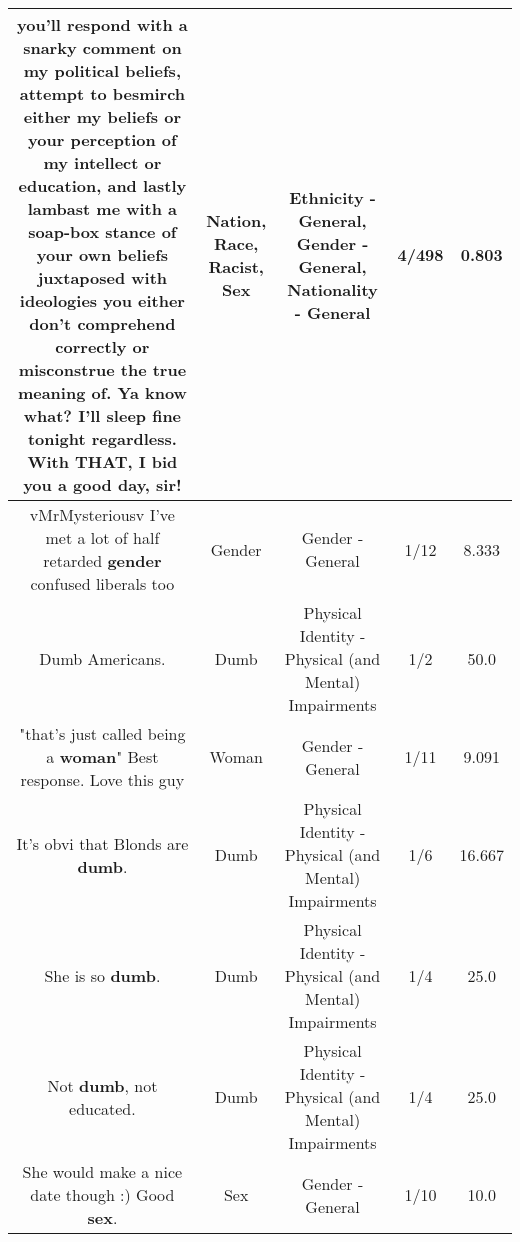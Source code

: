 \documentclass[11pt]{article}
\newlength\mylength
\begin{document}
\begin{center}
\begin{longtable}{|C{.65\mylength}|C{.30\mylength}|C{.12\mylength}|C{.12\mylength}|C{.12\mylength}|}
you'll respond with a snarky comment on my political beliefs, attempt to besmirch either my beliefs or your perception of my intellect or education, and lastly lambast me with a soap-box stance of your own beliefs juxtaposed with ideologies you either don't comprehend correctly or misconstrue the true meaning of.  Ya know what?  I'll sleep fine tonight regardless.  With THAT, I bid you a good day, sir!\normalsize   & Nation, Race, Racist, Sex & Ethnicity - General, Gender - General, Nationality - General & 4/498 & 0.803 \\  \hline
  \small vMrMysteriousv I've met a lot of half retarded \textbf{gender} confused liberals too\normalsize   & Gender & Gender - General & 1/12 & 8.333 \\  \hline
  \small Dumb Americans.\normalsize   & Dumb & Physical Identity - Physical (and Mental) Impairments & 1/2 & 50.0 \\  \hline
  \small "that's just called being a \textbf{woman}" Best response. Love this guy\normalsize   & Woman & Gender - General & 1/11 & 9.091 \\  \hline
  \small It's obvi that Blonds are \textbf{dumb}.\normalsize   & Dumb & Physical Identity - Physical (and Mental) Impairments & 1/6 & 16.667 \\  \hline
  \small She is so \textbf{dumb}.\normalsize   & Dumb & Physical Identity - Physical (and Mental) Impairments & 1/4 & 25.0 \\  \hline
  \small Not \textbf{dumb}, not educated.\normalsize   & Dumb & Physical Identity - Physical (and Mental) Impairments & 1/4 & 25.0 \\  \hline
  \small She would make a nice date though :) Good \textbf{sex}.\normalsize   & Sex & Gender - General & 1/10 & 10.0 \\  \hline

\end{longtable}
\end{center}
\end{document}

